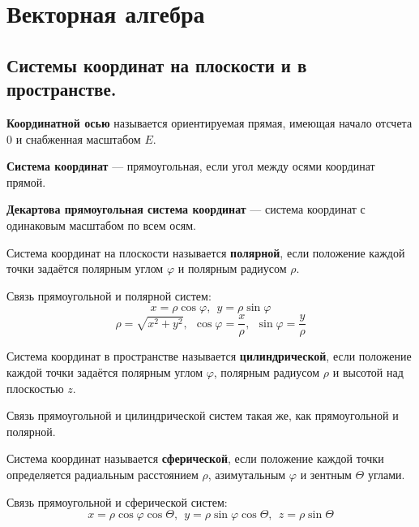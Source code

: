 

\usepackage{gensymb}

\cfoot{}


\newcommand{\doref}[1]{Дано выше. \textit{(\ref{#1}, стр. \pageref{#1})}}
\setlength{\parindent}{0pt}


\section{Векторная алгебра}
\subsection{Системы координат на плоскости и в пространстве.}
\begin{definition}
    \textbf{Координатной осью} называется ориентируемая прямая, имеющая начало отсчета $0$ и снабженная масштабом $E$.
\end{definition}
\begin{definition}
    \textbf{Система координат} --- прямоугольная, если угол между осями координат прямой.
\end{definition}
\begin{definition}
    \textbf{Декартова прямоугольная система координат} --- система координат с одинаковым масштабом по всем осям.
\end{definition}
\begin{definition}
    Система координат на плоскости называется \textbf{полярной}, если положение каждой точки задаётся полярным углом $\varphi$ и полярным радиусом $\rho$.
\end{definition}
Связь прямоугольной и полярной систем:
$$x=\rho\cos\varphi,\ \ y=\rho\sin\varphi$$
$$\rho=\sqrt{x^2+y^2},\ \ \cos\varphi=\frac{x}{\rho},\ \ \sin\varphi=\frac{y}{\rho}$$
\begin{definition}
    Система координат в пространстве называется \textbf{цилиндрической}, если положение каждой точки задаётся полярным углом $\varphi$, полярным радиусом $\rho$ и высотой над плоскостью $z$.
\end{definition}
Связь прямоугольной и цилиндрической систем такая же, как прямоугольной и полярной.
\begin{definition}
    Система координат называется \textbf{сферической}, если положение каждой точки определяется радиальным расстоянием $\rho$, азимутальным $\varphi$ и зентным $\Theta$ углами.
\end{definition}
Связь прямоугольной и сферической систем:
$$x=\rho\cos\varphi\cos\Theta, \ \ y=\rho\sin\varphi\cos\Theta, \ \ z=\rho\sin\Theta$$
